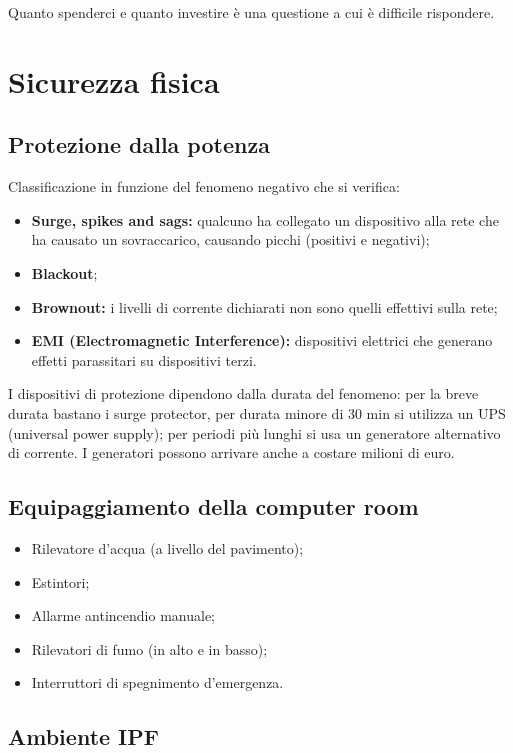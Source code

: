Quanto spenderci e quanto investire è una questione a cui è difficile 
rispondere.

\section{Sicurezza fisica}
\label{SFDP:fisica}
\subsection{Protezione dalla potenza}

Classificazione in funzione del fenomeno negativo che si verifica:
\begin{itemize}
\item \textbf{Surge, spikes and sags:} qualcuno ha collegato un dispositivo alla rete che 
ha causato un sovraccarico, causando picchi (positivi e negativi);
\item \textbf{Blackout};
\item \textbf{Brownout:} i livelli di corrente dichiarati non sono quelli effettivi sulla 
rete;
\item \textbf{EMI (Electromagnetic Interference):} dispositivi elettrici che generano 
effetti parassitari su dispositivi terzi.
\end{itemize}

I dispositivi di protezione dipendono dalla durata del fenomeno: per la breve
durata bastano i surge protector, per durata minore di 30 min si utilizza un UPS 
(universal power supply); per periodi più lunghi si usa un generatore 
alternativo di corrente. I generatori possono arrivare anche a costare milioni 
di euro.

\subsection{Equipaggiamento della computer room}

\begin{itemize}
\item Rilevatore d'acqua (a livello del pavimento);
\item Estintori;
\item Allarme antincendio manuale;
\item Rilevatori di fumo (in alto e in basso);
\item Interruttori di spegnimento d'emergenza.
\end{itemize}

\subsection{Ambiente IPF}

